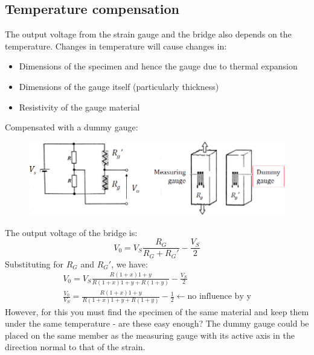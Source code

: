 \documentclass[class=report, crop=false, 12pt,a4paper, tikz, border=4mm]{standalone}
\begin{document}
\subsection{Temperature compensation}
The output voltage from the strain gauge and the bridge also depends on the temperature. Changes in temperature will cause changes in:
\begin{itemize}
  \item Dimensions of the specimen and hence the gauge due to thermal expansion
  \item Dimensions of the gauge itself (particularly thickness)
  \item Resistivity of the gauge material
\end{itemize}
Compensated with a dummy gauge:
\begin{figure}[H]
  \centering
  \includegraphics[width = 0.8 \textwidth]{../img/diagram13.png}
\end{figure}
The output voltage of the bridge is: 
\begin{equation}
  V_0 = V_S \frac{R_G}{R_G + R_G'} - \frac{V_S}{2}
\end{equation}
Substituting for $R_G$ and $R_G'$, we have:
\begin{gather}
  V_0 = V_S \frac{R(1+x){1+y}}{R(1+x){1+y} + R(1+y)} - \frac{V_S}{2}\\
  \frac{V_0}{V_S} = \frac{R(1+x){1+y}}{R(1+x){1+y} + R(1+y)} - \frac{1}{2} \leftarrow \textrm{no influence by y}
\end{gather}
However, for this you must find the specimen of the same material and keep them under the same temperature - are these easy enough? The dummy gauge could be placed on the same member as the measuring gauge with its active axis in the direction normal to that of the strain.
\end{document}
